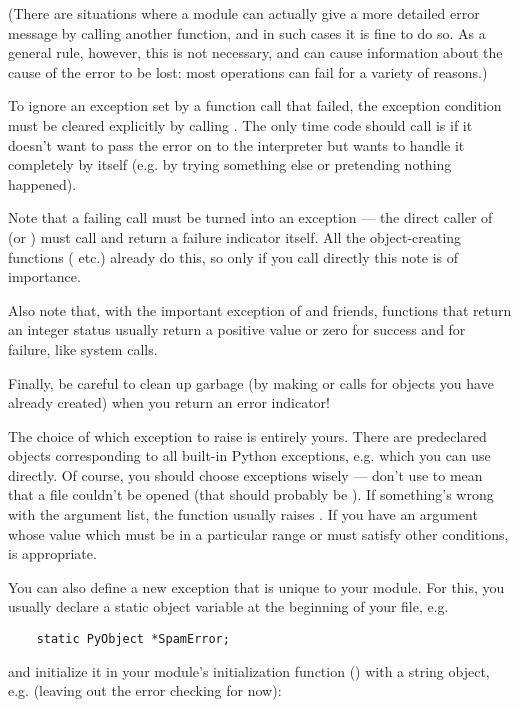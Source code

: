 \documentclass[twoside,openright]{report}
\begin{document}
(There are situations where a module can actually give a more detailed
error message by calling another  function, and in
such cases it is fine to do so.  As a general rule, however, this is
not necessary, and can cause information about the cause of the error
to be lost: most operations can fail for a variety of reasons.)

To ignore an exception set by a function call that failed, the exception
condition must be cleared explicitly by calling . 
The only time \C{} code should call  is if it doesn't
want to pass the error on to the interpreter but wants to handle it
completely by itself (e.g. by trying something else or pretending
nothing happened).

Note that a failing  call must be turned into an
exception --- the direct caller of  (or
) must call  and return a
failure indicator itself.  All the object-creating functions
( etc.) already do this, so only if you call
 directly this note is of importance.

Also note that, with the important exception of
 and friends, functions that return an
integer status usually return a positive value or zero for success and
 for failure, like \UNIX{} system calls.

Finally, be careful to clean up garbage (by making 
or  calls for objects you have already created) when
you return an error indicator!

The choice of which exception to raise is entirely yours.  There are
predeclared \C{} objects corresponding to all built-in Python exceptions,
e.g.  which you can use directly.  Of
course, you should choose exceptions wisely --- don't use
 to mean that a file couldn't be opened (that
should probably be ).  If something's wrong with
the argument list, the  function usually
raises .  If you have an argument whose value
which must be in a particular range or must satisfy other conditions,
 is appropriate.

You can also define a new exception that is unique to your module.
For this, you usually declare a static object variable at the
beginning of your file, e.g.

\bcode\begin{verbatim}
    static PyObject *SpamError;
\end{verbatim}\ecode
%
and initialize it in your module's initialization function
() with a string object, e.g. (leaving out the error
checking for now):
\end{document}
